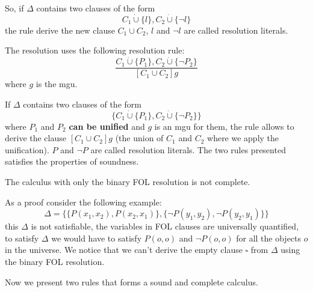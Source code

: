 \documentclass[10pt, letterpaper]{report}
\begin{document}
So, if $\Delta$ contains two clauses of the form\[C_1\dot\cup\{l\},C_2\dot\cup\{\lnot l\}\]
the rule derive the new clause $C_1\cup C_2$, $l$ and $\lnot l$ are called resolution literals. 
\begin{definition}
    The resolution uses the following resolution rule:\begin{equation}
        \frac{C_1\dot\cup\{P_1\},C_2\dot\cup\{\lnot P_2\}}{[C_1\cup C_2]g}
    \end{equation}
    where $g$ is the mgu.
\end{definition}
If $\Delta$ contains two clauses of the form 
$$\{C_1\dot\cup\{P_1\},C_2\dot\cup\{\lnot P_2\}\}$$
where $P_1$ and $P_2$ \textbf{can be unified} and $g$ is an mgu for them, the rule allows to derive the clause $[C_1\cup C_2]g$ (the union of $C_1$ and $C_2$ where we apply the unification). $P$ and $\lnot P$ are called resolution literals. The two rules presented satisfies the properties of soundness.
\begin{theorem}
    The calculus with only the binary FOL resolution is not complete.
\end{theorem}
As a proof consider the following example:\begin{equation}
    \Delta=\{
        \{P(x_1,x_2),P(x_2,x_1)\},
        \{\lnot P(y_1,y_2),\lnot P(y_2,y_1)\}
    \}
\end{equation}
this $\Delta$ is not satisfiable, the variables in FOL clauses are universally quantified, to satisfy $\Delta$ we would have to satisfy $P(o,o)$ and $\lnot P(o,o)$ for all the objects $o$ in the universe. We notice that we can't derive the empty clause $\square$ from $\Delta$ using the binary FOL resolution.\bigskip


Now we present two rules that forms a sound and complete calculus.
\end{document}
